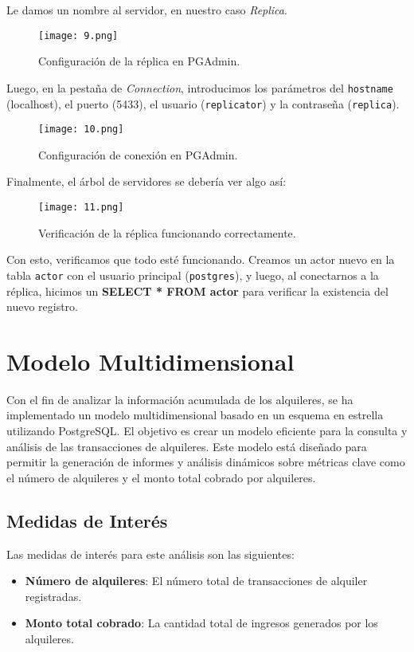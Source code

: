 \documentclass{article}
\begin{document}
Le damos un nombre al servidor, en nuestro caso \textit{Replica}.

\begin{figure}[h]
    \centering
    \texttt{[image: 9.png]}
    \caption{Configuración de la réplica en PGAdmin.}
\end{figure}

\newpage
Luego, en la pestaña de \textit{Connection}, introducimos los parámetros del \texttt{hostname} (localhost), el puerto (5433), el usuario (\texttt{replicator}) y la contraseña (\texttt{replica}).

\begin{figure}[h]
    \centering
    \texttt{[image: 10.png]}
    \caption{Configuración de conexión en PGAdmin.}
\end{figure}

Finalmente, el árbol de servidores se debería ver algo así:

\begin{figure}[h]
    \centering
    \texttt{[image: 11.png]}
    \caption{Verificación de la réplica funcionando correctamente.}
\end{figure}

Con esto, verificamos que todo esté funcionando. Creamos un actor nuevo en la tabla \texttt{actor} con el usuario principal (\texttt{postgres}), y luego, al conectarnos a la réplica, hicimos un \textbf{SELECT * FROM actor} para verificar la existencia del nuevo registro.

\newpage
\section{Modelo Multidimensional}

Con el fin de analizar la información acumulada de los alquileres, se ha implementado un modelo multidimensional basado en un esquema en estrella utilizando PostgreSQL. El objetivo es crear un modelo eficiente para la consulta y análisis de las transacciones de alquileres. Este modelo está diseñado para permitir la generación de informes y análisis dinámicos sobre métricas clave como el número de alquileres y el monto total cobrado por alquileres.

\subsection{Medidas de Interés}

Las medidas de interés para este análisis son las siguientes:
\begin{itemize}
    \item \textbf{Número de alquileres}: El número total de transacciones de alquiler registradas.
    \item \textbf{Monto total cobrado}: La cantidad total de ingresos generados por los alquileres.
\end{itemize}
\end{document}
